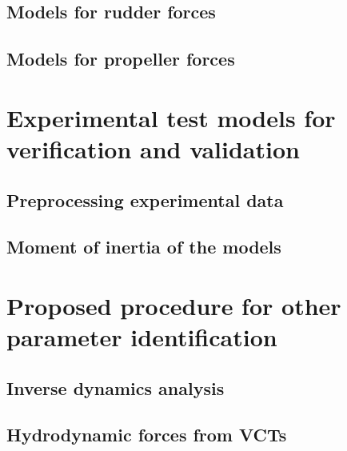 \documentclass[preprint,11pt,authoryear]{elsarticle}
\begin{document}
\subsection{Models for rudder forces}

\subsection{Models for propeller forces}

\FloatBarrier


\section{Experimental test models for verification and validation}
\label{sec:test_cases}

\FloatBarrier
\subsection{Preprocessing experimental data}

\FloatBarrier
\subsection{Moment of inertia of the models}



\section{Proposed procedure for other parameter identification} \label{sec:PIT}

%
\subsection{Inverse dynamics analysis}


\subsection{Hydrodynamic forces from VCTs}
\label{sec:methodology_VCT}

\FloatBarrier
% 
\end{document}
